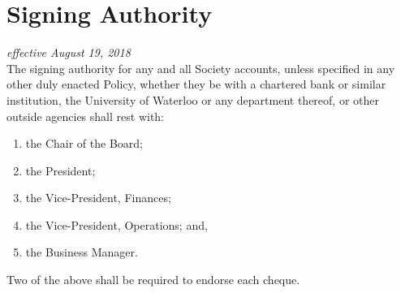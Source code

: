 \section{Signing Authority}
\emph{effective August 19, 2018}\\

The signing authority for any and all Society accounts, unless specified in any
other duly enacted Policy, whether they be with a chartered bank or similar
institution, the University of Waterloo or any department thereof, or other
outside agencies shall rest with:

\begin{enumerate}
    \item the Chair of the Board;
    \item the President;
    \item the Vice-President, Finances;
    \item the Vice-President, Operations; and,
    \item the Business Manager.
\end{enumerate}

Two of the above shall be required to endorse each cheque.
